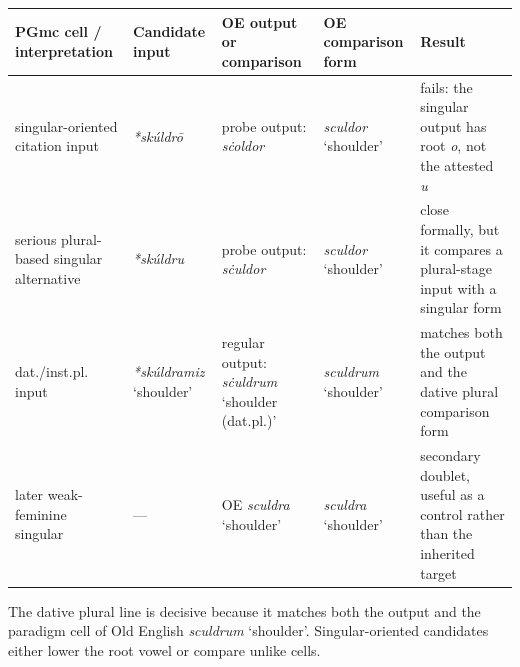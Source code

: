 \documentclass[
  british,
  a4paper,
  openany]{book}
\newcounter{none} %
\providecommand{\Recon}[1]{\emph{*#1}}
{\catcode`→=\active \global\def→{\ensuremath{\rightarrow}}}
\providecommand{\Recon}[1]{\emph{*#1}}
{\catcode`→=\active \global\def→{\ensuremath{\rightarrow}}}
\begin{document}
{\def\LTcaptype{none} %
\begin{longtable}[]{@{}
  >{\raggedright\arraybackslash}p{}
  >{\raggedright\arraybackslash}p{}
  >{\raggedright\arraybackslash}p{}
  >{\raggedright\arraybackslash}p{}
  >{\raggedright\arraybackslash}p{}@{}}
\toprule\noalign{}
\begin{minipage}[b]{\linewidth}\raggedright
PGmc cell / interpretation
\end{minipage} & \begin{minipage}[b]{\linewidth}\raggedright
Candidate input
\end{minipage} & \begin{minipage}[b]{\linewidth}\raggedright
OE output or comparison
\end{minipage} & \begin{minipage}[b]{\linewidth}\raggedright
OE comparison form
\end{minipage} & \begin{minipage}[b]{\linewidth}\raggedright
Result
\end{minipage} \\
\midrule\noalign{}
\endhead
\bottomrule\noalign{}
\endlastfoot
singular-oriented citation input & {\emph{*skúldrō}} & probe output:
{\emph{sċoldor}} & {\emph{sculdor}} `shoulder' & fails: the singular
output has root \emph{o}, not the attested \emph{u} \\
serious plural-based singular alternative & {\emph{*skúldru}} & probe
output: {\emph{sċuldor}} & {\emph{sculdor}} `shoulder' & close formally,
but it compares a plural-stage input with a singular form \\
dat./inst.pl. input & {\Recon{skúldramiz} `shoulder'} & regular output:
{\emph{sċuldrum}} `shoulder (dat.pl.)' & {\emph{sculdrum}} `shoulder' &
matches both the output and the dative plural comparison form \\
later weak-feminine singular & --- & OE {\emph{sculdra}} `shoulder' &
{\emph{sculdra}} `shoulder' & secondary doublet, useful as a control
rather than the inherited target \\
\end{longtable}
}

The dative plural line is decisive because it matches both the output
and the paradigm cell of Old English {\emph{sculdrum}} `shoulder'.
Singular-oriented candidates either lower the root vowel or compare
unlike cells.
\end{document}
